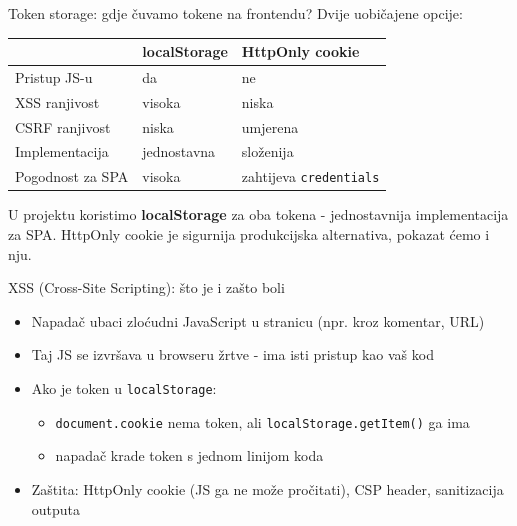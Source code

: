 \begin{frame}{Token storage: gdje čuvamo tokene na frontendu?}
	Dvije uobičajene opcije:

	\vspace{0.6em}
	\begin{tabular}{@{}lll@{}}
		\toprule
		& \textbf{localStorage} & \textbf{HttpOnly cookie} \\
		\midrule
		Pristup JS-u         & da                  & ne \\
		XSS ranjivost        & visoka              & niska \\
		CSRF ranjivost       & niska               & umjerena \\
		Implementacija       & jednostavna         & složenija \\
		Pogodnost za SPA     & visoka              & zahtijeva \texttt{credentials} \\
		\bottomrule
	\end{tabular}

	\vspace{0.6em}
	U projektu koristimo \textbf{localStorage} za oba tokena - jednostavnija implementacija za SPA. HttpOnly cookie je sigurnija produkcijska alternativa, pokazat ćemo i nju.
\end{frame}

\begin{frame}{XSS (Cross-Site Scripting): što je i zašto boli}
	\begin{itemize}
		\item Napadač ubaci zloćudni JavaScript u stranicu (npr. kroz komentar, URL)
		\item Taj JS se izvršava u browseru žrtve - ima isti pristup kao vaš kod
		\item Ako je token u \texttt{localStorage}:
		\begin{itemize}
			\item \texttt{document.cookie} nema token, ali \texttt{localStorage.getItem()} ga ima
			\item napadač krade token s jednom linijom koda
		\end{itemize}
		\item Zaštita: HttpOnly cookie (JS ga ne može pročitati), CSP header, sanitizacija outputa
	\end{itemize}
\end{frame}

